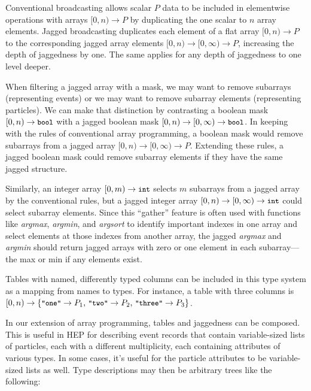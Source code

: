 \documentclass{webofc}
\begin{document}
Conventional broadcasting allows scalar $P$ data to be included in elementwise operations with arrays $[0, n) \to P$ by duplicating the one scalar to $n$ array elements. Jagged broadcasting duplicates each element of a flat array $[0, n) \to P$ to the corresponding jagged array elements $[0, n) \to [0, \infty) \to P$, increasing the depth of jaggedness by one. The same applies for any depth of jaggedness to one level deeper.

When filtering a jagged array with a mask, we may want to remove subarrays (representing events) or we may want to remove subarray elements (representing particles). We can make that distinction by contrasting a boolean mask $[0, n) \to \mbox{\small\tt bool}$ with a jagged boolean mask $[0, n) \to [0, \infty) \to \mbox{\small\tt bool}$. In keeping with the rules of conventional array programming, a boolean mask would remove subarrays from a jagged array $[0, n) \to [0, \infty) \to P$. Extending these rules, a jagged boolean mask could remove subarray elements if they have the same jagged structure.

Similarly, an integer array $[0, m) \to \mbox{\small\tt int}$ selects $m$ subarrays from a jagged array by the conventional rules, but a jagged integer array $[0, n) \to [0, \infty) \to \mbox{\small\tt int}$ could select subarray elements. Since this ``gather'' feature is often used with functions like {\it argmax}, {\it argmin}, and {\it argsort} to identify important indexes in one array and select elements at those indexes from another array, the jagged {\it argmax} and {\it argmin} should return jagged arrays with zero or one element in each subarray--- the max or min if any elements exist.

Tables with named, differently typed columns can be included in this type system as a mapping from names to types. For instance, a table with three columns is $[0, n) \to \{\mbox{\small\tt "one"} \to P_1\mbox{, }\mbox{\small\tt "two"} \to P_2\mbox{, }\mbox{\small\tt "three"} \to P_3\}$.


In our extension of array programming, tables and jaggedness can be composed. This is useful in HEP for describing event records that contain variable-sized lists of particles, each with a different multiplicity, each containing attributes of various types. In some cases, it's useful for the particle attributes to be variable-sized lists as well. Type descriptions may then be arbitrary trees like the following:
\end{document}
